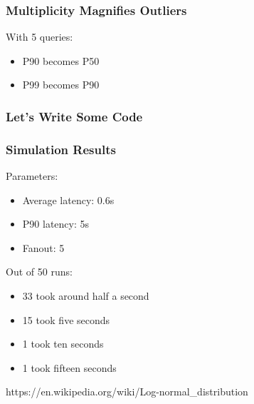 \begin{frame}
\frametitle{Multiplicity Magnifies Outliers}

With 5 queries:

\begin{itemize}
\item P90 becomes P50
\item P99 becomes P90
\end{itemize}

\end{frame}

\begin{frame}
\frametitle{Let's Write Some Code}



\end{frame}

\begin{frame}
\frametitle{Simulation Results}

Parameters:
\begin{itemize}
\item Average latency: 0.6s
\item P90 latency: 5s
\item Fanout: 5
\end{itemize}

Out of 50 runs:

\begin{itemize}
\item 33 took around half a second
\item 15 took five seconds
\item 1 took ten seconds
\item 1 took fifteen seconds
\end{itemize}
\end{frame}

https://en.wikipedia.org/wiki/Log-normal_distribution


